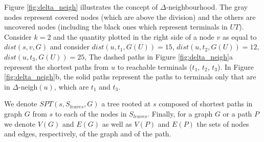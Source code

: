 Figure \ref{fig:delta_neigh} illustrates the concept of $\Delta$-neighbourhood. The gray nodes represent covered nodes (which are above the division) and the others are 
uncovered nodes (including the black ones which represent terminals in $UT$). Consider $k = 2$ and the quantity plotted in the right side of a node $v$ as equal to $dist(s,v,G)$ and consider 
$dist(u,t_1,G(U)) = 15$, $dist(u,t_2,G(U)) = 12$, $dist(u,t_3,G(U)) = 25$, The dashed paths in 
Figure \ref{fig:delta_neigh}a represent the shortest paths from $u$ to reachable terminals ($t_1$, $t_2$, $t_3$). In Figure \ref{fig:delta_neigh}b, the solid paths represent 
the paths to terminals only that are in $\Delta$-neigh$(u)$, which are $t_1$ and $t_3$.


We denote $SPT(s, S_{leaves}, G)$ a tree rooted at $s$ composed of shortest paths in graph $G$ from $s$ to each of the nodes in $S_{leaves}$.
Finally, for a graph $G$ or a path $P$ we denote $V(G)$ and $E(G)$ as well as $V(P)$ and $E(P)$ the sets of nodes and edges, respectively, of the graph and of
the path.


%
%

